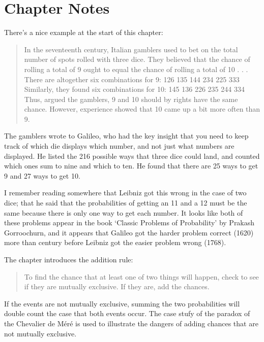\documentclass[
]{book}
\begin{document}
\hypertarget{chapter-notes-13}{%
\section{Chapter Notes}\label{chapter-notes-13}}

There's a nice example at the start of this chapter:

\begin{quote}
In the seventeenth century, Italian gamblers used to bet on the total number of spots rolled with three dice. They believed that the chance of rolling a total of 9 ought to equal the chance of rolling a total of 10 . . . There are altogether six combinations for 9:
126
135
144
234
225
333
Similarly, they found six combinations for 10:
145
136
226
235
244
334
Thus, argued the gamblers, 9 and 10 should by rights have the same chance. However, experience showed that 10 came up a bit more often than 9.
\end{quote}

The gamblers wrote to Galileo, who had the key insight that you need to keep track of which die displays which number, and not just what numbers are displayed. He listed the 216 possible ways that three dice could land, and counted which ones sum to nine and which to ten. He found that there are 25 ways to get 9 and 27 ways to get 10.

I remember reading somewhere that Leibniz got this wrong in the case of two dice; that he said that the probabilities of getting an 11 and a 12 must be the same because there is only one way to get each number. It looks like both of these problems appear in the book `Classic Problems of Probability' by Prakash Gorroochurn, and it appears that Galileo got the harder problem correct (1620) more than century before Leibniz got the easier problem wrong (1768).

The chapter introduces the addition rule:

\begin{quote}
To find the chance that at least one of two things will happen, check to see if they are mutually exclusive. If they are, add the chances.
\end{quote}

If the events are not mutually exclusive, summing the two probabilities will double count the case that both events occur. The case stufy of the paradox of the Chevalier de Méré is used to illustrate the dangers of adding chances that are not mutually exclusive.
\end{document}

